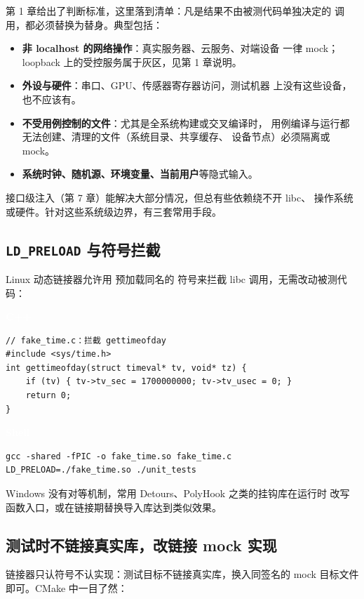 \documentclass[12pt,a4paper,fontset=fandol]{ctexbook}
\newcommand{\cpplabel}{%
  \begin{tcolorbox}[enhanced,colback=cppheadbg,colframe=cppheadbg,
    arc=1mm,boxrule=0mm,left=6pt,right=6pt,top=2pt,bottom=2pt,
    halign=left,oversize]
    \textcolor{white}{\small\bfseries C++}
  \end{tcolorbox}\vspace{-4pt}}
\newcommand{\bashlabel}{%
  \begin{tcolorbox}[enhanced,colback=black!80,colframe=black!80,
    arc=1mm,boxrule=0mm,left=6pt,right=6pt,top=2pt,bottom=2pt,
    halign=left,oversize]
    \textcolor{white}{\small\bfseries Shell}
  \end{tcolorbox}\vspace{-4pt}}
\begin{document}
第 1 章给出了判断标准，这里落到清单：凡是结果不由被测代码单独决定的
调用，都必须替换为替身。典型包括：

\begin{itemize}
  \item \textbf{非 localhost 的网络操作}：真实服务器、云服务、对端设备
        一律 mock；loopback 上的受控服务属于灰区，见第 1 章说明。
  \item \textbf{外设与硬件}：串口、GPU、传感器寄存器访问，测试机器
        上没有这些设备，也不应该有。
  \item \textbf{不受用例控制的文件}：尤其是全系统构建或交叉编译时，
        用例编译与运行都无法创建、清理的文件（系统目录、共享缓存、
        设备节点）必须隔离或 mock。
  \item \textbf{系统时钟、随机源、环境变量、当前用户}等隐式输入。
\end{itemize}

接口级注入（第 7 章）能解决大部分情况，但总有些依赖绕不开 libc、
操作系统或硬件。针对这些系统级边界，有三套常用手段。

\subsection{\texttt{LD\_PRELOAD} 与符号拦截}

Linux 动态链接器允许用  预加载同名的
符号来拦截 libc 调用，无需改动被测代码：

\cpplabel
\begin{lstlisting}
// fake_time.c：拦截 gettimeofday
#include <sys/time.h>
int gettimeofday(struct timeval* tv, void* tz) {
    if (tv) { tv->tv_sec = 1700000000; tv->tv_usec = 0; }
    return 0;
}
\end{lstlisting}

\bashlabel
\begin{lstlisting}
gcc -shared -fPIC -o fake_time.so fake_time.c
LD_PRELOAD=./fake_time.so ./unit_tests
\end{lstlisting}

Windows 没有对等机制，常用 Detours、PolyHook 之类的挂钩库在运行时
改写函数入口，或在链接期替换导入库达到类似效果。

\subsection{测试时不链接真实库，改链接 mock 实现}

链接器只认符号不认实现：测试目标不链接真实库，换入同签名的 mock
目标文件即可。CMake 中一目了然：
\end{document}
